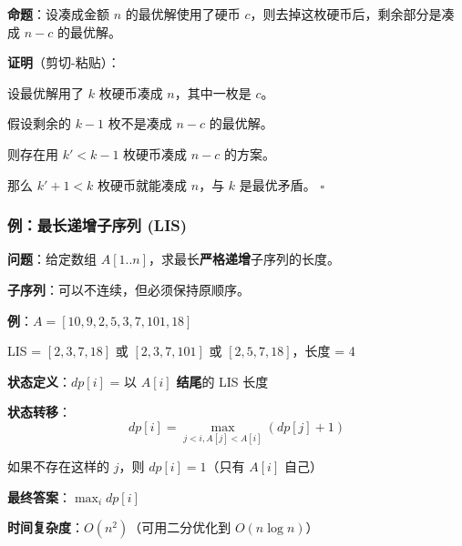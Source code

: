 \documentclass[12pt, a4paper]{ctexart}
\begin{document}
\begin{blackboard}[硬币找零的最优子结构证明]

\textbf{命题}：设凑成金额 $n$ 的最优解使用了硬币 $c$，则去掉这枚硬币后，剩余部分是凑成 $n-c$ 的最优解。

\textbf{证明}（剪切-粘贴）：

设最优解用了 $k$ 枚硬币凑成 $n$，其中一枚是 $c$。

假设剩余的 $k-1$ 枚不是凑成 $n-c$ 的最优解。

则存在用 $k' < k-1$ 枚硬币凑成 $n-c$ 的方案。

那么 $k' + 1 < k$ 枚硬币就能凑成 $n$，与 $k$ 是最优矛盾。 $\square$

\end{blackboard}

\subsubsection{例：最长递增子序列 (LIS)}

\begin{blackboard}

\textbf{问题}：给定数组 $A[1..n]$，求最长\textbf{严格递增}子序列的长度。

\textbf{子序列}：可以不连续，但必须保持原顺序。

\textbf{例}：$A = [10, 9, 2, 5, 3, 7, 101, 18]$

LIS = $[2, 3, 7, 18]$ 或 $[2, 3, 7, 101]$ 或 $[2, 5, 7, 18]$，长度 = 4

\end{blackboard}

\begin{blackboard}[LIS 的 DP 解法]

\textbf{状态定义}：$dp[i]$ = 以 $A[i]$ \textbf{结尾}的 LIS 长度

\textbf{状态转移}：
\[
dp[i] = \max_{j < i, A[j] < A[i]} (dp[j] + 1)
\]

如果不存在这样的 $j$，则 $dp[i] = 1$（只有 $A[i]$ 自己）

\textbf{最终答案}：$\max_{i} dp[i]$

\textbf{时间复杂度}：$O(n^2)$（可用二分优化到 $O(n \log n)$）

\end{blackboard}
\end{document}
